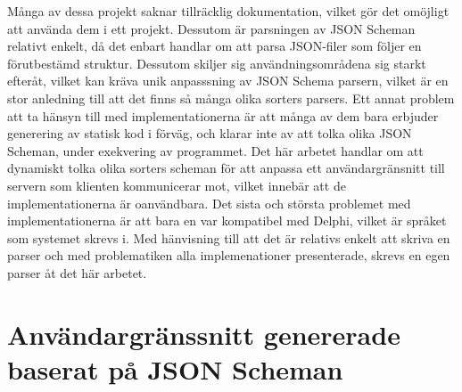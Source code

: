 Många av dessa projekt saknar tillräcklig dokumentation, vilket gör det omöjligt att använda dem i ett projekt. Dessutom är parsningen av JSON Scheman relativt enkelt, då det enbart handlar om att parsa JSON-filer som följer en förutbestämd struktur. Dessutom skiljer sig användningsområdena sig starkt efteråt, vilket kan kräva unik anpasssning av JSON Schema parsern, vilket är en stor anledning till att det finns så många olika sorters parsers. Ett annat problem att ta hänsyn till med implementationerna är att många av dem bara erbjuder generering av statisk kod i förväg, och klarar inte av att tolka olika JSON Scheman, under exekvering av programmet. Det här arbetet handlar om att dynamiskt tolka olika sorters scheman för att anpassa ett användargränsnitt till servern som klienten kommunicerar mot, vilket innebär att de implementationerna är oanvändbara. Det sista och största problemet med implementationerna är att bara en var kompatibel med Delphi, vilket är språket som systemet skrevs i. Med hänvisning till att det är relativs enkelt att skriva en parser och med problematiken alla implemenationer presenterade, skrevs en egen parser åt det här arbetet.

\section{Användargränssnitt genererade baserat på JSON Scheman}
